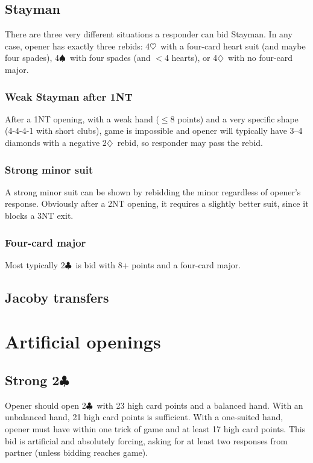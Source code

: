 \documentclass[oneside]{memoir}
\def\C{$\clubsuit$}
\def\D{$\diamondsuit$}
\def\H{$\heartsuit$}
\def\S{$\spadesuit$}
\let\TeXle\le
\def\lt{$<$}
\def\le{$\TeXle$}
\begin{document}
\section{Stayman}
There are three very different situations a responder can bid Stayman.
In any case, opener has exactly three rebids: 4\H\ with a four-card heart
suit (and maybe four spades), 4\S\ with four spades (and \lt4 hearts), or
4\D\ with no four-card major.

\subsection{Weak Stayman after 1NT}
After a 1NT opening, with a weak
hand (\le8 points) and a very specific shape (4-4-4-1 with short clubs),
game is impossible and opener will typically have 3--4 diamonds with a
negative 2\D\ rebid, so responder may pass the rebid.
\subsection{Strong minor suit}
A strong minor suit can be shown by rebidding the minor regardless of
opener's response.  Obviously after a 2NT opening, it requires a slightly
better suit, since it blocks a 3NT exit.
\subsection{Four-card major}
Most typically 2\C\ is bid with 8+ points and a four-card major.

\section{Jacoby transfers}


\chapter{Artificial openings}

\section{Strong 2\C}

Opener should open 2\C\ with 23 high card points and a balanced hand.
With an unbalanced hand, 21 high card points is sufficient.  With a
one-suited hand, opener must have within one trick of game and at least
17 high card points.  This bid is artificial and absolutely forcing,
asking for at least two responses from partner (unless bidding
reaches game).
\end{document}
